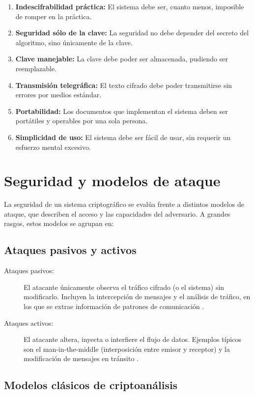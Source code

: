 \begin{enumerate}
  \item \textbf{Indescifrabilidad práctica:} El sistema debe ser, cuanto menos, imposible de romper en la práctica.
  \item \textbf{Seguridad sólo de la clave:} La seguridad no debe depender del secreto del algoritmo, sino únicamente de la clave.
  \item \textbf{Clave manejable:} La clave debe poder ser almacenada, pudiendo ser reemplazable.
  \item \textbf{Transmisión telegráfica:} El texto cifrado debe poder transmitirse sin errores por medios estándar.
  \item \textbf{Portabilidad:} Los documentos que implementan el sistema deben ser portátiles y operables por una sola persona.
  \item \textbf{Simplicidad de uso:} El sistema debe ser fácil de usar, sin requerir un esfuerzo mental excesivo.
\end{enumerate}

\section{Seguridad y modelos de ataque}
La seguridad de un sistema criptográfico se evalúa frente a distintos modelos de ataque, que describen el acceso y las capacidades del adversario. A grandes rasgos, estos modelos se agrupan en:

\subsection{Ataques pasivos y activos}

\begin{description}
  \item[Ataques pasivos:] El atacante únicamente observa el tráfico cifrado (o el sistema) sin modificarlo. Incluyen la intercepción de mensajes y el análisis de tráfico, en los que se extrae información de patrones de comunicación \cite{infosectrain-attacks}\cite{gfg-active-passive}.
  \item[Ataques activos:] El atacante altera, inyecta o interfiere el flujo de datos. Ejemplos típicos son el man-in-the-middle (interposición entre emisor y receptor) y la modificación de mensajes en tránsito \cite{goallsecure-attacks}.
\end{description}

\subsection{Modelos clásicos de criptoanálisis}

